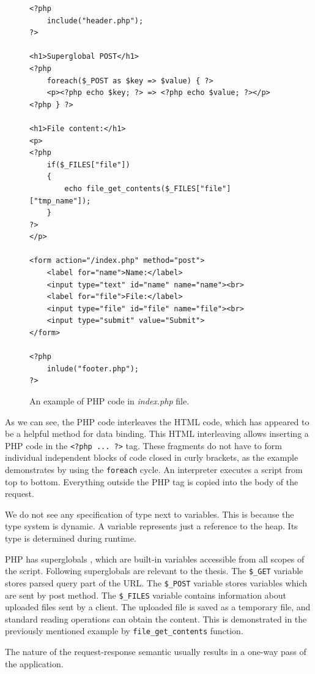 \begin{figure}
\begin{lstlisting}
<?php
    include("header.php");
?>

<h1>Superglobal POST</h1>
<?php
    foreach($_POST as $key => $value) { ?>
    <p><?php echo $key; ?> => <?php echo $value; ?></p>
<?php } ?>

<h1>File content:</h1>
<p>
<?php 
    if($_FILES["file"])
    {
        echo file_get_contents($_FILES["file"]["tmp_name"]);
    }	
?>
</p>

<form action="/index.php" method="post">
    <label for="name">Name:</label>
    <input type="text" id="name" name="name"><br>
    <label for="file">File:</label>
    <input type="file" id="file" name="file"><br>
    <input type="submit" value="Submit">
</form>

<?php
    inlude("footer.php");
?>
\end{lstlisting}
\caption{An example of PHP code in \textit{index.php} file.}
\label{img01:php}
\end{figure}
\par
As we can see, the PHP code interleaves the HTML code, which has appeared to be a helpful method for data binding.
This HTML interleaving allows inserting a PHP code in the \texttt{<?php ... ?>} tag.
These fragments do not have to form individual independent blocks of code closed in curly brackets, as the example demonstrates by using the \texttt{foreach} cycle.
An interpreter executes a script from top to bottom. Everything outside the PHP tag is copied into the body of the request.
\par
We do not see any specification of type next to variables.
This is because the type system is dynamic.
A variable represents just a reference to the heap.
Its type is determined during runtime. 
\par
PHP has superglobals \cite{online:phpManual}, which are built-in variables accessible from all scopes of the script.
Following superglobals are relevant to the thesis.
The \texttt{\$\_GET} variable stores parsed query part of the URL.
The \texttt{\$\_POST} variable stores variables which are sent by post method.
The \texttt{\$\_FILES} variable contains information about uploaded files sent by a client.
The uploaded file is saved as a temporary file, and standard reading operations can obtain the content.
This is demonstrated in the previously mentioned example by \texttt{file\_get\_contents} function.
\par
The nature of the request-response semantic usually results in a one-way pass of the application.
